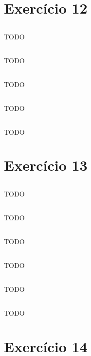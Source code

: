 \documentclass{article}
\begin{document}
\section{Exercício 12}
\subsection{}
TODO
\subsection{}
TODO
\subsection{}
TODO
\subsection{}
TODO
\subsection{}
TODO

\section{Exercício 13}
\subsection{}
TODO
\subsection{}
TODO
\subsection{}
TODO
\subsection{}
TODO
\subsection{}
TODO
\subsection{}
TODO

\section{Exercício 14}
\end{document}
